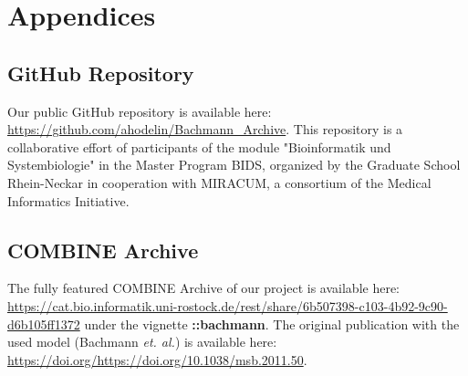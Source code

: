 \section*{Appendices}

\subsection*{GitHub Repository}

Our public GitHub repository is available here: \url{https://github.com/ahodelin/Bachmann_Archive}.
This repository is a collaborative effort of participants of the module "Bioinformatik und Systembiologie" in the Master Program BIDS, organized by the Graduate School Rhein-Neckar in cooperation with MIRACUM, a consortium of the Medical Informatics Initiative.


\subsection*{COMBINE Archive}

The fully featured COMBINE Archive of our project is available here: \url{https://cat.bio.informatik.uni-rostock.de/rest/share/6b507398-c103-4b92-9c90-d6b105ff1372} under the vignette  \textbf{::bachmann}. The original publication with the used model (Bachmann \textit{et. al.}) is available here: \url{https://doi.org/https://doi.org/10.1038/msb.2011.50}.